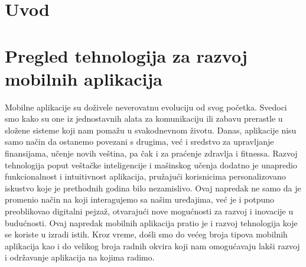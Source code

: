 \documentclass[12pt,oneside]{memoir}
\begin{document}
\frontmatter
\naslovna
\komisija
\apstrakt
\tableofcontents*

\mainmatter

\chapter{Uvod}

\chapter{Pregled tehnologija za razvoj mobilnih aplikacija}
\label{chp:pregledTehnologijaZaRazvojMobilnihAplikacija}

Mobilne aplikacije su doživele neverovatnu evoluciju od svog početka. Svedoci smo kako su one iz jednostavnih alata za komunikaciju ili zabavu prerastle u složene sisteme koji nam pomažu u svakodnevnom životu. Danas, aplikacije nisu samo način da ostanemo povezani s drugima, već i sredstvo za upravljanje finansijama, učenje novih veština, pa čak i za praćenje zdravlja i fitnessa. Razvoj tehnologija poput veštačke inteligencije i mašinskog učenja dodatno je unapredio funkcionalnost i intuitivnost aplikacija, pružajući korisnicima personalizovano iskustvo koje je prethodnih godina bilo nezamislivo. Ovaj napredak ne samo da je promenio način na koji interagujemo sa našim uređajima, već je i potpuno preoblikovao digitalni pejzaž, otvarajući nove mogućnosti za razvoj i inovacije u budućnosti. Ovaj napredak mobilnih aplikacija pratio je i razvoj tehnologija koje se koriste u izradi istih. Kroz vreme, došli smo do većeg broja tipova mobilnih aplikacija kao i do velikog broja radnih okvira koji nam omogućavaju lakši razvoj i održavanje aplikacija na kojima radimo.
\end{document}
